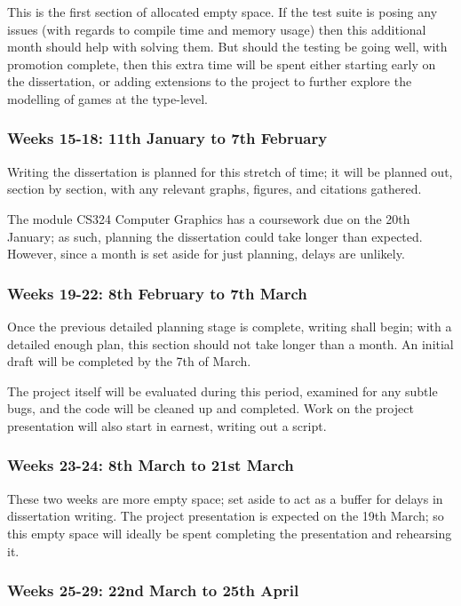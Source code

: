 \documentclass[12pt, a4paper]{scrartcl}
\begin{document}
This is the first section of allocated empty space. If the test suite is posing any issues (with regards to compile time and memory usage) then this additional month should help with solving them. But should the testing be going well, with promotion complete, then this extra time will be spent either starting early on the dissertation, or adding extensions to the project to further explore the modelling of games at the type-level.

\subsubsection{Weeks 15-18: 11th January to 7th February}

Writing the dissertation is planned for this stretch of time; it will be planned out, section by section, with any relevant graphs, figures, and citations gathered.

The module CS324 Computer Graphics has a coursework due on the 20th January; as such, planning the dissertation could take longer than expected. However, since a month is set aside for just planning, delays are unlikely.

\subsubsection{Weeks 19-22: 8th February to 7th March}

Once the previous detailed planning stage is complete, writing shall begin; with a detailed enough plan, this section should not take longer than a month. An initial draft will be completed by the 7th of March.

The project itself will be evaluated during this period, examined for any subtle bugs, and the code will be cleaned up and completed. Work on the project presentation will also start in earnest, writing out a script.

\subsubsection{Weeks 23-24: 8th March to 21st March}

These two weeks are more empty space; set aside to act as a buffer for delays in dissertation writing. The project presentation is expected on the 19th March; so this empty space will ideally be spent completing the presentation and rehearsing it.

\subsubsection{Weeks 25-29: 22nd March to 25th April}
\end{document}
